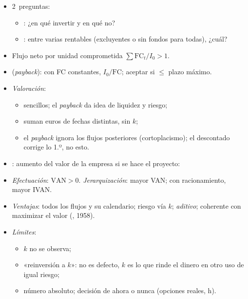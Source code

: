 \documentclass{article}
\begin{document}
\begin{columnas}
\begin{itemize}
\item 2~preguntas:
  \begin{itemize}
  \item {}: ¿en qué invertir y en qué no?
  \item {}: entre varias rentables (excluyentes o sin fondos para todas), ¿cuál?
  \end{itemize}
\end{itemize}
\begin{itemize}
\item Flujo neto por unidad comprometida $\sum\mathrm{FC}_t/I_0>1$.
\item {} (\emph{payback}): con FC constantes, $I_0/\mathrm{FC}$; aceptar si $\leq$ plazo máximo.
\item \emph{Valoración}:
  \begin{itemize}
  \item sencillos; el \emph{payback} da idea de liquidez y riesgo;
  \item suman euros de fechas distintas, sin $k$;
  \item el \emph{payback} ignora los flujos posteriores (cortoplacismo); el descontado corrige lo 1.º, no esto.
  \end{itemize}
\end{itemize}
\begin{itemize}
\item {}: aumento del valor de la empresa si se hace el proyecto:
\item \emph{Efectuación}: $\mathrm{VAN}>0$. \emph{Jerarquización}: mayor VAN; con racionamiento, mayor IVAN.
\item \emph{Ventajas}: todos los flujos y su calendario; riesgo vía $k$; \emph{aditivo}; coherente con maximizar el valor (, 1958).
\item \emph{Límites}:
  \begin{itemize}
  \item $k$ no se observa;
  \item «reinversión a $k$»: no es defecto, $k$ es lo que rinde el dinero en otro uso de igual riesgo;
  \item número absoluto; decisión de ahora o nunca (opciones reales, h).

\end{itemize}
\end{itemize}
\end{columnas}
\end{document}
